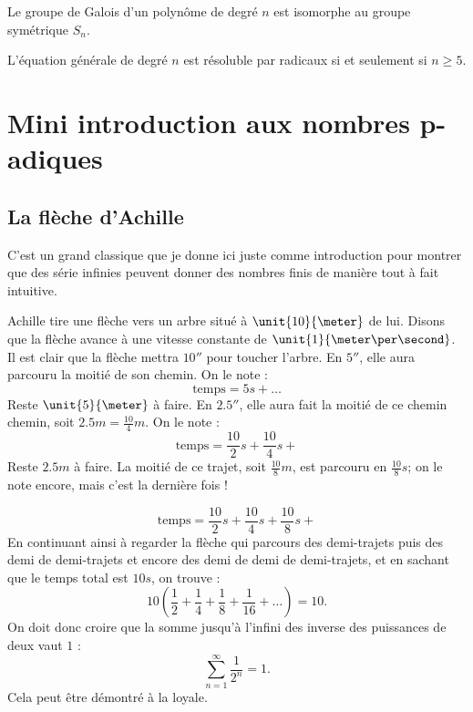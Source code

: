 \begin{theorem}
    Le groupe de Galois d'un polynôme de degré \( n\) est isomorphe au groupe symétrique \( S_n\).
\end{theorem}

\begin{corollary}
    L'équation générale de degré \( n\) est résoluble par radicaux si et seulement si \( n\geq 5\).
\end{corollary}

\section{Mini introduction aux nombres \texorpdfstring{p}{$p$}-adiques}


\subsection{La flèche d'Achille}\label{s:un}

C'est un grand classique que je donne ici juste comme introduction pour montrer que des série infinies peuvent donner des nombres finis de manière tout à fait intuitive.

Achille tire une flèche vers un arbre situé à $\unit{10}{\meter}$ de lui. Disons que la flèche avance à une vitesse constante de $\unit{1}{\meter\per\second}$. Il est clair que la flèche mettra $\unit{10}{\second}$ pour toucher l'arbre. En $\unit{5}{\second}$, elle aura parcouru la moitié de son chemin. On le note :
\[
\text{temps}=5s+\ldots
\]
Reste \( \unit{5}{\meter}\) à faire. En $\unit{2.5}{\second}$, elle aura fait la moitié de ce chemin chemin, soit $2.5m=\frac{10}{4}m$. On le note :
\[
\text{temps}=\frac{10}{2}s+\frac{10}{4}s+
\]
Reste $2.5m$ à faire. La moitié de ce trajet, soit $\frac{10}{8}m$, est parcouru en $\frac{10}{8}s$; on le note encore, mais c'est la dernière fois !

\[
\text{temps}=\frac{10}{2}s+\frac{10}{4}s+\frac{10}{8}s+
\]
En continuant ainsi à regarder la flèche qui parcours des demi-trajets puis des demi de demi-trajets et encore des demi de demi de demi-trajets, et en sachant que le temps total est $10s$, on trouve :
\[
10\left( \frac{1}{2}+\frac{1}{4}+\frac{1}{8}+\frac{1}{16}+\ldots  \right)=10.
\]
On doit donc croire que la somme jusqu'à l'infini des inverse des puissances de deux vaut $1$ :
\[
   \sum_{n=1}^{\infty}\frac{1}{2^n}=1.
\]
Cela peut être démontré à la loyale.

